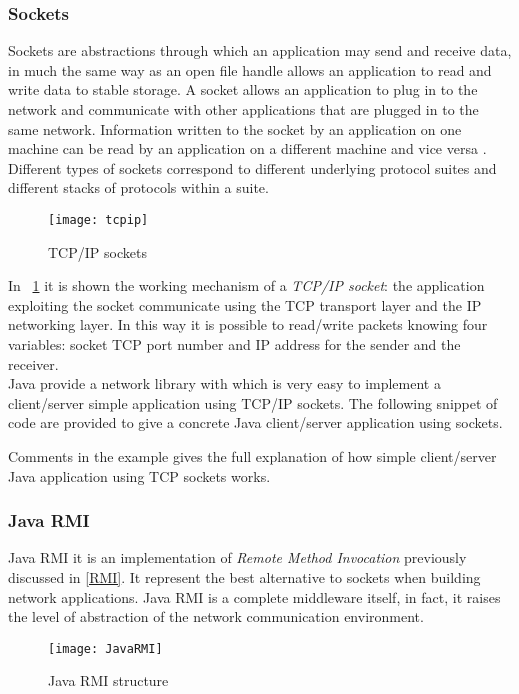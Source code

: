 \subsubsection{Sockets} \label{socket} Sockets are abstractions through which an application may send and receive data, in much the same way as an open file handle allows an application to read and write data to stable storage.
A socket allows an application to plug in to the network and communicate with other applications that are plugged in to the same network. Information written to the socket by
an application on one machine can be read by an application on a different machine and vice versa \cite{calvert2011tcp}.
Different types of sockets correspond to different underlying protocol suites and different
stacks of protocols within a suite.
\begin{figure}[h]
	\centering
	\texttt{[image: tcpip]}
	\caption{TCP/IP sockets}
	\label{fig:2.15}
\end{figure}
In \figurename~\ref{fig:2.15} it is shown the working mechanism of a \textit{TCP/IP socket}: the application exploiting the socket communicate using the TCP transport layer and the IP networking layer. In this way it is possible to read/write packets knowing four variables: socket TCP port number and IP address for the sender and the receiver.\\
Java provide a network library with which is very easy to implement a client/server simple application using TCP/IP sockets. The following snippet of code are provided to give a concrete Java client/server application using sockets.


Comments in the example gives the full explanation of how simple client/server Java application using TCP sockets works.

\subsubsection{Java RMI} Java RMI it is an implementation of \textit{Remote Method Invocation} previously discussed in \ref{RMI}. It represent the best alternative to sockets when building network applications. Java RMI is a complete middleware itself, in fact, it raises the level of abstraction of the network communication environment.
\begin{figure}[h]
	\centering
	\texttt{[image: JavaRMI]}
	\caption{Java RMI structure}
	\label{fig:2.16}
\end{figure}

